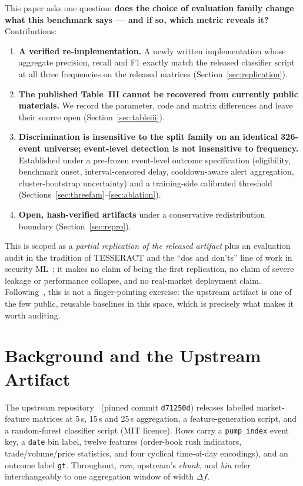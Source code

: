 \documentclass[runningheads]{llncs}
\begin{document}
This paper asks one question: \textbf{does the choice of evaluation
family change what this benchmark says --- and if so, which metric
reveals it?} Contributions:

\begin{enumerate}
\item \textbf{A verified re-implementation.} A newly written
implementation whose aggregate precision, recall and F1 exactly match
the released classifier script at all three frequencies on the released
matrices (Section~\ref{sec:replication}).
\item \textbf{The published Table~III cannot be recovered from
currently public materials.} We record the parameter, code and matrix
differences and leave their source open
(Section~\ref{sec:tableiii}).
\item \textbf{Discrimination is insensitive to the split family on an
identical 326-event universe; event-level detection is not insensitive
to frequency.} Established under a pre-frozen event-level outcome
specification (eligibility, benchmark onset, interval-censored delay,
cooldown-aware alert aggregation, cluster-bootstrap uncertainty) and a
training-side calibrated threshold
(Sections~\ref{sec:threefam}--\ref{sec:ablation}).
\item \textbf{Open, hash-verified artifacts} under a conservative
redistribution boundary (Section~\ref{sec:repro}).
\end{enumerate}

This is scoped as a \emph{partial replication of the released artifact}
plus an evaluation audit in the tradition of TESSERACT and the ``dos
and don'ts'' line of work in security
ML~\cite{Rougier2017,Gundersen2018,Pineau2021,Pendlebury2019,Arp2022};
it makes no claim of being the first replication, no claim of severe
leakage or performance collapse, and no real-market deployment claim.
Following~\cite{Arp2022}, this is not a finger-pointing exercise: the
upstream artifact is one of the few public, reusable baselines in this
space, which is precisely what makes it worth auditing.

\section{Background and the Upstream Artifact}\label{sec:background}

The upstream repository~\cite{UpstreamRepo} (pinned commit
\texttt{d71250d}) releases labelled market-feature matrices at 5\,s,
15\,s and 25\,s aggregation, a feature-generation script, and a
random-forest classifier script (MIT licence). Rows carry a
\texttt{pump\_index} event key, a \texttt{date} bin label, twelve
features (order-book rush indicators, trade/volume/price statistics,
and four cyclical time-of-day encodings), and an outcome label
\texttt{gt}. Throughout, \emph{row}, upstream's \emph{chunk}, and
\emph{bin} refer interchangeably to one aggregation window of width
$\Delta f$.
\end{document}
